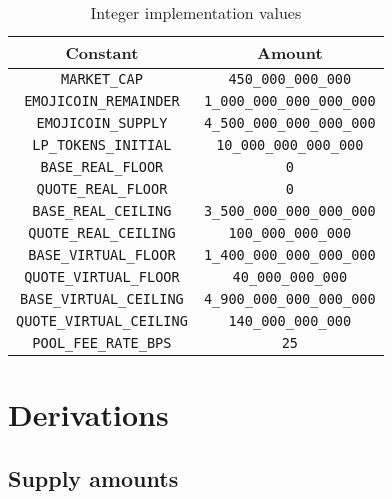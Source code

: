 \documentclass[table, twocolumn]{article}
\begin{document}
\begin{table}[!htb]
  \centering
  \begin{tabular}{|c|c|}
    \hline \rowcolor{blue}
    Constant                         & Amount                              \\ \hline
    \texttt{MARKET\_CAP}             & \texttt{450\_000\_000\_000}         \\ \hline
    \texttt{EMOJICOIN\_REMAINDER}    & \texttt{1\_000\_000\_000\_000\_000} \\ \hline
    \texttt{EMOJICOIN\_SUPPLY}       & \texttt{4\_500\_000\_000\_000\_000} \\ \hline
    \texttt{LP\_TOKENS\_INITIAL}     & \texttt{10\_000\_000\_000\_000}     \\ \hline
    \texttt{BASE\_REAL\_FLOOR}       & \texttt{0}                          \\ \hline
    \texttt{QUOTE\_REAL\_FLOOR}      & \texttt{0}                          \\ \hline
    \texttt{BASE\_REAL\_CEILING}     & \texttt{3\_500\_000\_000\_000\_000} \\ \hline
    \texttt{QUOTE\_REAL\_CEILING}    & \texttt{100\_000\_000\_000}         \\ \hline
    \texttt{BASE\_VIRTUAL\_FLOOR}    & \texttt{1\_400\_000\_000\_000\_000} \\ \hline
    \texttt{QUOTE\_VIRTUAL\_FLOOR}   & \texttt{40\_000\_000\_000}          \\ \hline
    \texttt{BASE\_VIRTUAL\_CEILING}  & \texttt{4\_900\_000\_000\_000\_000} \\ \hline
    \texttt{QUOTE\_VIRTUAL\_CEILING} & \texttt{140\_000\_000\_000}         \\ \hline
    \texttt{POOL\_FEE\_RATE\_BPS}    & \texttt{25}                         \\ \hline
  \end{tabular}
  \caption{Integer implementation values}
  \label{tab:integer-implementation-values}
\end{table}

\section{Derivations} \label{sec:derivations}

\subsection{Supply amounts} \label{sec:supply-amounts}
\end{document}
